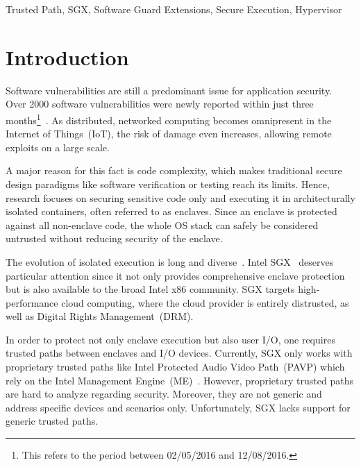 \documentclass{sig-alternate-05-2015}
\begin{document}
\begin{keywords}
Trusted Path, SGX, Software Guard Extensions, Secure Execution,  Hypervisor
\end{keywords}


\newcommand{\eg}{{\it e.g.\ }}
\newcommand{\ie}{{\it i.e.\ }}
\newcommand{\cf}{{\it cf.\ }}
\newcommand{\etal}{{\it et al.\ }}
\newcommand{\etalp}{{\it et al. }}
\newcommand{\etalpx}{{\it et al.}}
\newcommand{\etc}{{\it etc.\ }}
\newcommand{\etcp}{{\it etc. }}
\newcommand{\etcpx}{{\it etc.}}
\newcommand{\R}{\textsuperscript{\textregistered}}

\section{Introduction}\label{sec:intro}

Software vulnerabilities are still a predominant issue for application security. 
Over 2000 software vulnerabilities were newly reported within just three months\footnote{This refers to the period between 02/05/2016 and 12/08/2016.}~\cite{nvdsearch}. 
As distributed, networked computing becomes omnipresent in the Internet of Things~(IoT), the risk of damage even increases, allowing remote exploits on a large scale. 

A major reason for this fact is code complexity, which makes traditional secure design paradigms like software verification or testing reach its limits. 
Hence, research focuses on securing sensitive code only and executing it in architecturally isolated containers, often referred to as enclaves. 
Since an enclave is protected against all non-enclave code, the whole OS stack can safely be considered untrusted without reducing security of the enclave. 

The evolution of isolated execution is long and diverse~\cite{overshadow,sp3,ta-min_splitting_2006,mccune_trustvisor:_2010,hofmann_inktag:_2013,
criswell_virtual_2014,suh_aegis:_2003,champagne_scalable_2010,secureme,thekkath_architectural_2000,owusu_oasis:_2013,secureblue,sgxmanual,evtyushkin_iso-x:_2014,costan_sanctum:_2016,trustzone}. 
Intel SGX~\cite{sgxmanual} deserves particular attention since it not only provides comprehensive enclave protection but is also available to the broad Intel x86 community. 
SGX targets high-performance cloud computing, where the cloud provider is entirely distrusted, as well as Digital Rights Management~(DRM).

In order to protect not only enclave execution but also user I/O, one requires trusted paths between enclaves and I/O devices. Currently, SGX only works with proprietary trusted paths like Intel Protected Audio Video Path~(PAVP) which rely on the Intel Management Engine~(ME)~\cite{sgxsoftwaresolutions,ruan_platform_2014}. 
However, proprietary trusted paths are hard to analyze regarding security. 
Moreover, they are not generic and address specific devices and scenarios only. 
Unfortunately, SGX lacks support for generic trusted paths.
\end{document}
